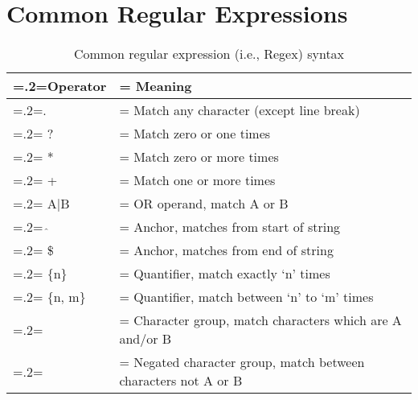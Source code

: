 
\chapter{Common Regular Expressions}

\begin{table}[H]
    \centering
    \renewcommand{\arraystretch}{1.2}
    \begin{tabularx}{0.85\textwidth}{|>{\hsize=.2\hsize\linewidth=\hsize}X|>{\hsize=0.8\hsize\linewidth=\hsize}X|} 
     \hline
      \textbf{Operator} & \textbf{Meaning} \\
     \hline
        . & Match any character (except line break) \\
        \hline
        ? &  Match zero or one times \\
        \hline
        * & Match zero or more times \\
        \hline
        + & Match one or more times \\
        \hline
        A$|$B & OR operand, match A or B \\
        \hline
        $\widehat{\ }$  & Anchor, matches from start of string \\
        \hline
        \$ & Anchor, matches from end of string \\
        \hline
        $\{\text{n}\}$ & Quantifier, match exactly `n' times \\
        \hline
        $\{\text{n, m}\}$ & Quantifier, match between `n' to `m' times \\
        \hline
        [AB] & Character group, match characters which are A and/or B \\
        \hline
        [$\widehat{\ }$AB] & Negated character group, match between characters not A or B\\
    \hline
    \end{tabularx}
    \caption{Common regular expression (i.e., Regex) syntax}
    \label{appendix:ops}
    \end{table}
